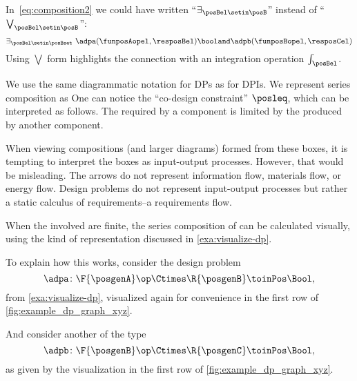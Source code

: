 In~\cref{eq:composition2} we could have written ``$\exists_{\posBel\setin \posB}$'' instead of ``$\bigvee_{\posBel\setin \posB}$'':
\begin{equation}
    \exists_{\posBel \setin \posBset}\  \adpa(\funposAopel,\resposBel) \booland \adpb(\funposBopel,\resposCel)
\end{equation}
Using $\bigvee$ form highlights the connection with an integration operation $\int_\posBel$.

We use the same diagrammatic notation for DPs as for DPIs.
We represent series composition as
%
%
One can notice the ``co-design constraint'' $\posleq$, which can be interpreted as follows.
The  required by a component is limited by the  produced by another component.

When viewing compositions (and larger diagrams) formed from these boxes, it is tempting to interpret the boxes as input-output processes.
However, that would be misleading.
The arrows do not represent information flow, materials flow, or energy flow.
Design problems do not represent input-output processes but rather a static calculus of requirements--a requirements flow.

When the  involved are finite, the series composition of  can be calculated visually, using the kind of representation discussed in \cref{exa:visualize-dp}.

To explain how this works, consider the design problem
\begin{equation}
    \adpa \colon \F{\posgenA} \op \Ctimes  \R{\posgenB} \toinPos \Bool,
\end{equation}
from \cref{exa:visualize-dp}, visualized again for convenience in the first row of \cref{fig:example_dp_graph_xyz}.

And consider another  of the type
\begin{equation}
    \adpb \colon \F{\posgenB} \op \Ctimes  \R{\posgenC} \toinPos \Bool,
\end{equation}
as given by the visualization in the first row of \cref{fig:example_dp_graph_xyz}.

